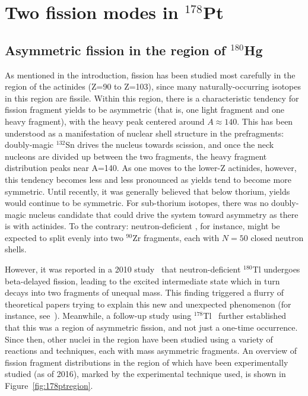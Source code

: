 \chapter{Two fission modes in $^{178}$Pt}\label{chap:178Pt}

\section{Asymmetric fission in the region of $^{180}$Hg}
As mentioned in the introduction, fission has been studied most carefully in the region of the actinides (Z=90 to Z=103), since many naturally-occurring isotopes in this region are fissile. Within this region, there is a characteristic tendency for fission fragment yields to be asymmetric (that is, one light fragment and one heavy fragment), with the heavy peak centered around $A\approx140$. This has been understood as a manifestation of nuclear shell structure in the prefragments: doubly-magic $^{132}$Sn drives the nucleus towards scission, and once the neck nucleons are divided up between the two fragments, the heavy fragment distribution peaks near A=140. As one moves to the lower-Z actinides, however, this tendency becomes less and less pronounced as yields tend to become more symmetric. Until recently, it was generally believed that below thorium, yields would continue to be symmetric. For sub-thorium isotopes, there was no doubly-magic nucleus candidate that could drive the system toward asymmetry as there is with actinides. To the contrary: neutron-deficient {\Hg}, for instance, might be expected to split evenly into two $^{90}$Zr fragments, each with $N=50$ closed neutron shells.

However, it was reported in a 2010 study~\cite{Andreyev2010} that neutron-deficient $^{180}$Tl undergoes beta-delayed fission, leading to the excited intermediate state {\Hg} which in turn decays into two fragments of unequal mass. This finding triggered a flurry of theoretical papers trying to explain this new and unexpected phenomenon (for instance, see~\cite{Warda2012,Moller2012,Mcdonnell2014,Ichikawa2019}). Meanwhile, a follow-up study using $^{178}$Tl~\cite{Liberati2013} further established that this was a region of asymmetric fission, and not just a one-time occurrence. Since then, other nuclei in the region have been studied using a variety of reactions and techniques, each with mass asymmetric fragments. An overview of fission fragment distributions in the region of {\Hg} which have been experimentally studied (as of 2016), marked by the experimental technique used, is shown in Figure~\ref{fig:178ptregion}.

